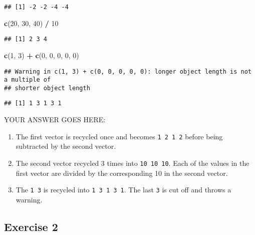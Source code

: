 \documentclass[
]{article}
\newenvironment{Shaded}{\begin{snugshade}}{\end{snugshade}}
\newcommand{\DecValTok}[1]{\textcolor[rgb]{0.00,0.00,0.81}{#1}}
\newcommand{\KeywordTok}[1]{\textcolor[rgb]{0.13,0.29,0.53}{\textbf{#1}}}
\newcommand{\NormalTok}[1]{#1}
\newcommand{\OperatorTok}[1]{\textcolor[rgb]{0.81,0.36,0.00}{\textbf{#1}}}
\newcommand{\StringTok}[1]{\textcolor[rgb]{0.31,0.60,0.02}{#1}}
\providecommand{\tightlist}{%
  \setlength{\itemsep}{0pt}\setlength{\parskip}{0pt}}
\begin{document}
\begin{verbatim}
## [1] -2 -2 -4 -4
\end{verbatim}

\begin{Shaded}
\begin{Highlighting}[]
\KeywordTok{c}\NormalTok{(}\DecValTok{20}\NormalTok{, }\DecValTok{30}\NormalTok{, }\DecValTok{40}\NormalTok{) }\OperatorTok{/}\StringTok{ }\DecValTok{10}
\end{Highlighting}
\end{Shaded}

\begin{verbatim}
## [1] 2 3 4
\end{verbatim}

\begin{Shaded}
\begin{Highlighting}[]
\KeywordTok{c}\NormalTok{(}\DecValTok{1}\NormalTok{, }\DecValTok{3}\NormalTok{) }\OperatorTok{+}\StringTok{ }\KeywordTok{c}\NormalTok{(}\DecValTok{0}\NormalTok{, }\DecValTok{0}\NormalTok{, }\DecValTok{0}\NormalTok{, }\DecValTok{0}\NormalTok{, }\DecValTok{0}\NormalTok{)}
\end{Highlighting}
\end{Shaded}

\begin{verbatim}
## Warning in c(1, 3) + c(0, 0, 0, 0, 0): longer object length is not a multiple of
## shorter object length
\end{verbatim}

\begin{verbatim}
## [1] 1 3 1 3 1
\end{verbatim}

YOUR ANSWER GOES HERE:

\begin{enumerate}
\def\labelenumi{\arabic{enumi}.}
\tightlist
\item
  The first vector is recycled once and becomes \texttt{1\ 2\ 1\ 2}
  before being subtracted by the second vector.
\item
  The second vector recycled 3 times into \texttt{10\ 10\ 10}. Each of
  the values in the first vector are divided by the corresponding 10 in
  the second vector.
\item
  The \texttt{1\ 3} is recycled into \texttt{1\ 3\ 1\ 3\ 1}. The last
  \texttt{3} is cut off and throws a warning.
\end{enumerate}

\hypertarget{exercise-2}{%
\subsection{Exercise 2}\label{exercise-2}}
\end{document}
